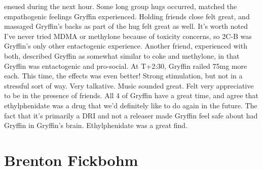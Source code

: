 \documentclass[12pt]{book}
\begin{document}
ensued during the next hour. Some long group hugs occurred, matched the empathogenic feelings Gryffin experienced. Holding friends close felt great, and massaged Gryffin's backs as part of the hug felt great as well. It's worth noted I've never tried MDMA or methylone because of toxicity concerns, so 2C-B was Gryffin's only other entactogenic experience. Another friend, experienced with both, described Gryffin as somewhat similar to coke and methylone, in that Gryffin was entactogenic and pro-social. At T+2:30, Gryffin railed 75mg more each. This time, the effects was even better! Strong stimulation, but not in a stressful sort of way. Very talkative. Music sounded great. Felt very appreciative to be in the presence of friends. All 4 of Gryffin have a great time, and agree that ethylphenidate was a drug that we'd definitely like to do again in the future. The fact that it's primarily a DRI and not a releaser made Gryffin feel safe about had Gryffin in Gryffin's brain. Ethylphenidate was a great find.



\chapter{Brenton Fickbohm}
\end{document}
